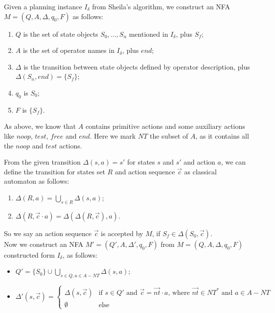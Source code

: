 \documentclass{article}
\begin{document}
Given a planning instance $I_\delta$ from Sheila's algorithm, we construct an NFA $M = (Q,A,\Delta,q_0,F)$ as follows:
\begin{enumerate}
  \item $Q$ is the set of state objects $S_0,\ldots,S_n$ mentioned in $I_\delta$, plus $S_f$;
  \item $A$ is the set of operator names in $I_\delta$, plus $end$;
  \item $\Delta$ is the transition between state objects defined by operator description, plus $\Delta(S_n,end)=\{S_f\}$;
  \item $q_0$ is $S_0$;
  \item $F$ is $\{S_f\}$.
\end{enumerate}

As above, we know that $A$ contains primitive actions and some auxiliary actions like
$noop$, $test$, $free$ and $end$. Here we mark $NT$ the subset of $A$, as it contains
all the $noop$ and $test$ actions.

From the given transition $\Delta(s,a)={s'}$ for states $s$ and $s'$ and action $a$,
we can define the transition for states set $R$ and action sequence $\vec{c}$ as classical automaton as follows:
\begin{enumerate}
  \item $\Delta(R,a)=\bigcup_{s\in R}\Delta(s,a)$;
  \item $\Delta(R,\vec{c}\cdot a)=\Delta(\Delta(R,\vec{c}),a)$.
\end{enumerate}

So we say an action sequence $\vec{c}$ is accepted by $M$, if $S_f\in\Delta(S_0,\vec{c})$.
\\

Now we construct an NFA $M'=(Q',A,\Delta',q_0,F)$ from $M=(Q,A,\Delta,q_0,F)$ constructed form $I_\delta$, as follows:
\begin{itemize}
  \item $Q'=\{S_0\}\cup\bigcup_{s\in Q, a\in A-NT}\Delta(s,a)$;
  \item
  \begin{displaymath}
    \Delta'(s,\vec{c}) = \left\{ \begin{array}{ll}
        \Delta(s,\vec{c}) & \textrm{if $s\in Q'$ and $\vec{c}=\vec{nt}\cdot a$, where $\vec{nt}\in NT^*$ and $a\in A-NT$}\\
        \emptyset & \textrm{else}
    \end{array} \right.
\end{displaymath}
\end{itemize}
\end{document}
